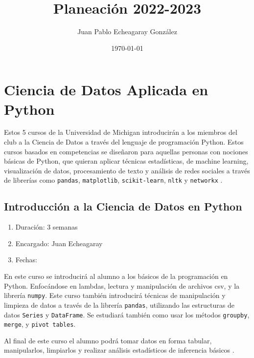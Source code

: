 \documentclass{article}
\title{Planeación 2022-2023}
\author{Juan Pablo Echeagaray González}
\date{\today}
\begin{document}
    \begin{titlepage}
        \maketitle
    \end{titlepage}

    \tableofcontents
    \clearpage

    \section{Ciencia de Datos Aplicada en Python}

        Estos 5 cursos de la Universidad de Michigan introducirán a los miembros del club a la Ciencia de Datos a través del lenguaje de programación Python. Estos cursos basados en competencias se diseñaron para aquellas personas con nociones básicas de Python, que quieran aplicar técnicas estadísticas, de machine learning, visualización de datos, procesamiento de texto y análisis de redes sociales a través de librerías como \texttt{pandas}, \texttt{matplotlib}, \texttt{scikit-learn}, \texttt{nltk} y \texttt{networkx} \cite{applied-ds}.

        \subsection{Introducción a la Ciencia de Datos en Python}

            \begin{enumerate}
                \item Duración: 3 semanas
                \item Encargado: Juan Echeagaray
                \item Fechas:
            \end{enumerate}

            En este curso se introducirá al alumno a los básicos de la programación en Python. Enfocándose en lambdas, lectura y manipulación de archivos csv, y la librería \texttt{numpy}. Este curso también introducirá técnicas de manipulación y limpieza de datos a través de la librería \texttt{pandas}, utilizando las estructuras de datos \texttt{Series} y \texttt{DataFrame}. Se estudiará también como usar los métodos \texttt{groupby}, \texttt{merge}, y \texttt{pivot tables}.

            Al final de este curso el alumno podrá tomar datos en forma tabular, manipularlos, limpiarlos y realizar análisis estadísticos de inferencia básicos \cite{intro-ds}.
\end{document}
